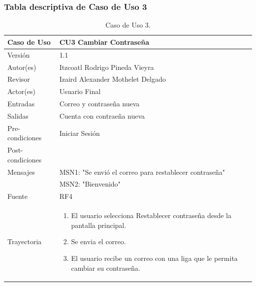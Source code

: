 \documentclass{article}
\begin{document}
\subsubsection{Tabla descriptiva de Caso de Uso 3}
\begin{table}[H]
\caption{Caso de Uso 3.}
\begin{tabular}{|M{4cm}|M{12cm}|}
\hline
Caso de Uso & CU3 Cambiar Contraseña\\ \hline
Versión & 1.1\\ \hline
Autor(es) & Itzcoatl Rodrigo Pineda Vieyra\\ \hline
Revisor & Izaird Alexander Mothelet Delgado \\ \hline
Actor(es) & Usuario Final \\ \hline
Entradas &  Correo y contraseña nueva \\ \hline
Salidas & Cuenta con contraeña nueva \\ \hline
Pre-condiciones & Iniciar Sesión \\ \hline
Post-condiciones & \\ \hline
Mensajes & MSN1: "Se envió el correo para restablecer contraseña"\\
		   & MSN2: "Bienvenido"\\ \hline
Fuente & RF4 \\ \hline	
Trayectoria &
\begin{enumerate}
\item El usuario selecciona Restablecer contraseña desde la pantalla principal.
\item Se envia el correo.
\item El usuario recibe un correo con una liga que le permita cambiar su contraseña.
\end{enumerate}
\\ \hline
\end{tabular}
\end{table}
\end{document}
